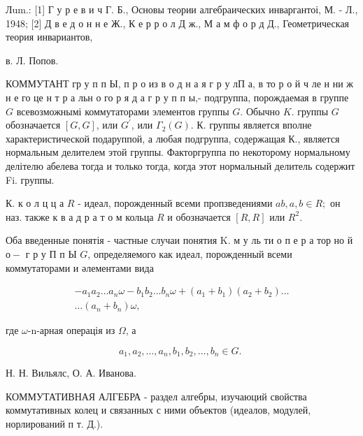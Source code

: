 \documentclass[10pt]{article}
\begin{document}
Лum.: [1] Г у р е в и ч Г. Б., Основы теории алгебраических инваргантоі, М. - Л., 1948; [2] Д в е д о н н е Ж., К е р р о л Д ж., М а м ф о р д Д., Геометрическая теория инвариантов,



в. Л. Попов.

КОММУТАНТ гр у п п Ы, п р о из в о д н а я г р у лП а, в то р о й ч ле н ни ж н е го це н т р а льн о го р я д а г р у п п ы,- подгруппа, порождаемая в группе $G$ всевозможнымі коммутаторами элементов группы $G$. Обычно $K$. группы $G$ обозначается $[G, G]$, или $G^{\prime}$, или $\Gamma_{2}(G)$. К. группы является вполне характеристической подаруппой, а любая подгруппа, содержащая К., является нормальным делителем этой группы. Факторгруппа по некоторому нормальному делітелю абелева тогда и только тогда, когда этот нормальный делитель содержит Fi. группы.



К. к о л ц ц а $R$ - идеал, порожденный всеми пропзведениями $a b, a, b \in R ;$ он наз. также к в а д р а т о м кольца $R$ и обозначается $[R, R]$ или $R^{2}$.



Оба введенные понятія - частные случаи понятия $\mathrm{K}$. м у ль ти о п е р а тор но й $о-$ г р у П п Ы $G$, определяемого как идеал, порожденный всеми коммутаторами и әлементами вида



\[

\begin{gathered}

-a_{1} a_{2} \ldots a_{n} \omega-b_{1} b_{2} \ldots b_{n} \omega+\left(a_{1}+b_{1}\right)\left(a_{2}+b_{2}\right) \ldots \\

\ldots\left(a_{n}+b_{n}\right) \omega,

\end{gathered}

\]



где $\omega$-n-арная операція из $\Omega$, а



\[

a_{1}, a_{2}, \ldots, a_{n}, b_{1}, b_{2}, \ldots, b_{n} \in G \text {. }

\]



Н. Н. Вильялс, О. А. Иванова.



КОММУТАТИВНАЯ АЛГЕБРА - раздел алгебры, изучаюций свойства коммутативных колец и связанных с ними объектов (идеалов, модулей, норлирований п т. Д.).
\end{document}
